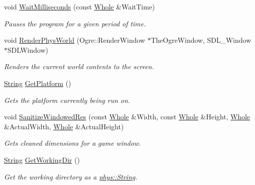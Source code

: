\begin{DoxyCompactItemize}
void \hyperlink{namespacephys_1_1crossplatform_ab525e3abf3625b83954e2d55a5869d18}{WaitMilliseconds} (const \hyperlink{namespacephys_a460f6bc24c8dd347b05e0366ae34f34a}{Whole} \&WaitTime)
\begin{DoxyCompactList}\small\item\em Pauses the program for a given period of time. \item\end{DoxyCompactList}\item 
void \hyperlink{namespacephys_1_1crossplatform_a858c6c4155c4315d6eafb18cc30ce434}{RenderPhysWorld} (Ogre::RenderWindow $\ast$TheOgreWindow, SDL\_\-Window $\ast$SDLWindow)
\begin{DoxyCompactList}\small\item\em Renders the current world contents to the screen. \item\end{DoxyCompactList}\item 
\hyperlink{namespacephys_aa03900411993de7fbfec4789bc1d392e}{String} \hyperlink{namespacephys_1_1crossplatform_af34fd6dc13360417a87c579744932dce}{GetPlatform} ()
\begin{DoxyCompactList}\small\item\em Gets the platform currently being run on. \item\end{DoxyCompactList}\item 
void \hyperlink{namespacephys_1_1crossplatform_ab8bf982a60b008f32c91c90354efc162}{SanitizeWindowedRes} (const \hyperlink{namespacephys_a460f6bc24c8dd347b05e0366ae34f34a}{Whole} \&Width, const \hyperlink{namespacephys_a460f6bc24c8dd347b05e0366ae34f34a}{Whole} \&Height, \hyperlink{namespacephys_a460f6bc24c8dd347b05e0366ae34f34a}{Whole} \&ActualWidth, \hyperlink{namespacephys_a460f6bc24c8dd347b05e0366ae34f34a}{Whole} \&ActualHeight)
\begin{DoxyCompactList}\small\item\em Gets cleaned dimensions for a game window. \item\end{DoxyCompactList}\item 
\hyperlink{namespacephys_aa03900411993de7fbfec4789bc1d392e}{String} \hyperlink{namespacephys_1_1crossplatform_aa13f8bf79ac9313095e9a1b935ef3a10}{GetWorkingDir} ()
\begin{DoxyCompactList}\small\item\em Get the working directory as a \hyperlink{namespacephys_aa03900411993de7fbfec4789bc1d392e}{phys::String}. \item\end{DoxyCompactList}\end{DoxyCompactItemize}



